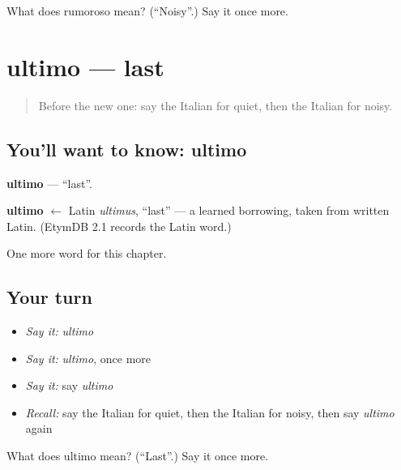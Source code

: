 \begin{tcolorbox}[breakable,colback=teal!4,colframe=teal!35!black,title={Before you move on}]
What does rumoroso mean? (\textquotedblleft{}Noisy\textquotedblright{}.) Say it once more.
\end{tcolorbox}
\section[ultimo]{ultimo — last}

\label{lesson:IT-C125-ultimo}



\begin{quote}
Before the new one: say the Italian for quiet, then the Italian for noisy.
\end{quote}

\subsection*{You'll want to know: ultimo}
\textbf{ultimo} — \textquotedblleft{}last\textquotedblright{}.

\begin{cousinweb}
\textbf{ultimo} $\leftarrow$ Latin \emph{ultimus}, \textquotedblleft{}last\textquotedblright{} — a learned borrowing, taken from written Latin. (EtymDB 2.1 records the Latin word.)
\end{cousinweb}

\begin{grammarlens}[title={What you've built}]
One more word for this chapter.
\end{grammarlens}

\subsection*{Your turn}
\begin{itemize}
\raggedright
  \item \emph{Say it:} \emph{ultimo}
  \item \emph{Say it:} \emph{ultimo}, once more
  \item \emph{Say it:} say \emph{ultimo}
  \item \emph{Recall:} say the Italian for quiet, then the Italian for noisy, then say \emph{ultimo} again
\end{itemize}

\begin{tcolorbox}[breakable,colback=teal!4,colframe=teal!35!black,title={Before you move on}]
What does ultimo mean? (\textquotedblleft{}Last\textquotedblright{}.) Say it once more.
\end{tcolorbox}
